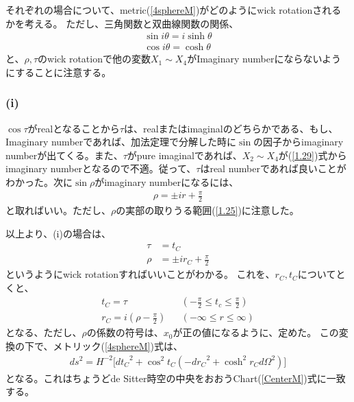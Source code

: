 それぞれの場合について、metric(\ref{4sphereM})がどのようにwick rotationされるかを考える。
ただし、三角関数と双曲線関数の関係、
\begin{eqnarray}
  \label{1.29}
  \sin{i\theta}=i\sinh{\theta} \\
  \label{1.30}
    \cos{i\theta}=\cosh{\theta}
\end{eqnarray}
と、$\rho,\tau$のwick rotationで他の変数$X_1\sim X_4$がImaginary numberにならないようにすることに注意する。
\subsubsection{(i)}
$\cos\tau$がrealとなることから$\tau$は、realまたはimaginalのどちらかである、もし、Imaginary numberであれば、加法定理で分解した時に$\sin$の因子からimaginary numberが出てくる。また、$\tau$がpure imaginalであれば、$X_2\sim X_4$が(\ref{1.29})式からimaginary numberとなるので不適。従って、$\tau$はreal numberであれば良いことがわかった。次に$\sin\rho$がimaginary numberになるには、
\begin{eqnarray}
  \rho=\pm ir+\frac{\pi}{2}
\end{eqnarray}
と取ればいい。ただし、$\rho$の実部の取りうる範囲(\ref{1.25})に注意した。

以上より、(i)の場合は、
\begin{align}
  \tau&=t_{C} \\
  \rho &= \pm ir_{C} +\frac{\pi}{2}
\end{align}
というようにwick rotationすればいいことがわかる。
これを、$r_{C},t_{C}$についてとくと、
\begin{align}
  t_{C} = \tau& &(-\frac{\pi}{2} \leqslant t_{c} \leqslant \frac{\pi}{2}) \\
  r_{C} =i(\rho-\frac{\pi}{2})& &(-\infty \leqslant r \leqslant \infty)
\end{align}
となる、ただし、$\rho$の係数の符号は、$x_0$が正の値になるように、定めた。
この変換の下で、メトリック(\ref{4sphereM})式は、
\begin{align}
  ds^2=H^{-2}\biggl[{dt_{C}}^2+\cos^2t_{C}(-{dr_{C}}^2+\cosh^2r_{C}d\Omega^2) \biggr]
\end{align}
となる。これはちょうどde Sitter時空の中央をおおうChart(\ref{CenterM})式に一致する。
